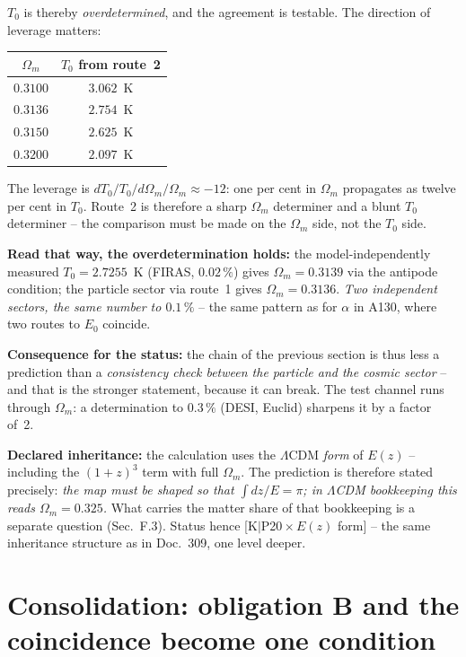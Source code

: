 \documentclass[11pt]{report}
\begin{document}
\noindent $T_0$ is thereby \emph{overdetermined}, and the
agreement is testable. The direction of leverage matters:

\begin{center}
\begin{tabular}{cc}
\toprule
$\Omega_m$ & $T_0$ from route~2 \\
\midrule
$0.3100$ & $3.062$~K \\
$0.3136$ & $2.754$~K \\
$0.3150$ & $2.625$~K \\
$0.3200$ & $2.097$~K \\
\bottomrule
\end{tabular}
\end{center}

\noindent The leverage is $dT_0/T_0 \big/ d\Omega_m/\Omega_m
\approx -12$: one per cent in $\Omega_m$ propagates as twelve per
cent in $T_0$. Route~2 is therefore a sharp $\Omega_m$ determiner
and a blunt $T_0$ determiner -- the comparison must be made on the
$\Omega_m$ side, not the $T_0$ side.

\textbf{Read that way, the overdetermination holds:} the
model-independently measured $T_0 = 2.7255$~K (FIRAS,
$0.02\,\%$) gives $\Omega_m = 0.3139$ via the antipode
condition; the particle sector via route~1 gives
$\Omega_m = 0.3136$. \emph{Two independent sectors, the same
number to $0.1\,\%$} -- the same pattern as for $\alpha$ in A130,
where two routes to $E_0$ coincide.

\textbf{Consequence for the status:} the chain of the previous
section is thus less a prediction than a \emph{consistency check
between the particle and the cosmic sector} -- and that is the
stronger statement, because it can break. The test channel runs
through $\Omega_m$: a determination to $0.3\,\%$ (DESI, Euclid)
sharpens it by a factor of~2.

\textbf{Declared inheritance:} the calculation uses the
$\Lambda$CDM \emph{form} of $E(z)$ -- including the $(1{+}z)^3$
term with full $\Omega_m$. The prediction is therefore stated
precisely: \emph{the map must be shaped so that
$\int dz/E = \pi$; in $\Lambda$CDM bookkeeping this reads
$\Omega_m = 0.325$.} What carries the matter share of that
bookkeeping is a separate question (Sec.~F.3). Status hence
[K$|$P20\,$\times$\,$E(z)$ form] -- the same inheritance
structure as in Doc.~309, one level deeper.

\section{Consolidation: obligation B and the coincidence become
one condition}
\end{document}
